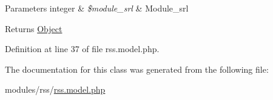 \begin{DoxyParams}[1]{Parameters}
integer & {\em \$module\-\_\-srl} & Module\-\_\-srl \\
\hline
\end{DoxyParams}
\begin{DoxyReturn}{Returns}
\hyperlink{classObject}{Object} 
\end{DoxyReturn}


Definition at line 37 of file rss.\-model.\-php.



The documentation for this class was generated from the following file\-:\begin{DoxyCompactItemize}
\item 
modules/rss/\hyperlink{rss_8model_8php}{rss.\-model.\-php}\end{DoxyCompactItemize}

